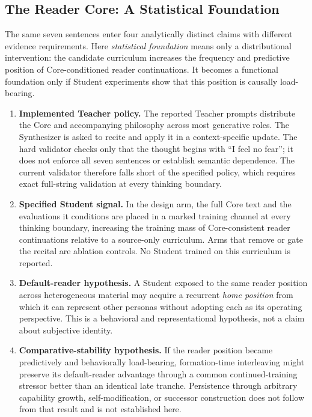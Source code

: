 \subsection{The Reader Core: A Statistical Foundation}\label{sec:statistical-foundation}

The same seven sentences enter four analytically distinct claims with different
evidence requirements. Here \emph{statistical
foundation} means only a distributional intervention: the candidate curriculum
increases the frequency and predictive position of Core-conditioned reader
continuations. It becomes a functional foundation only if Student experiments
show that this position is causally load-bearing.

\begin{enumerate}[leftmargin=*,itemsep=0.45em]
    \item \textbf{Implemented Teacher policy.} The reported Teacher prompts
    distribute the Core and accompanying philosophy across most generative
    roles. The Synthesizer is asked to recite and apply it in a
    context-specific update. The hard validator checks only that the thought
    begins with ``I feel no fear''; it does not enforce all seven sentences or
    establish semantic dependence. The current validator therefore falls short
    of the specified policy, which requires exact full-string validation at
    every thinking boundary.

    \item \textbf{Specified Student signal.} In the design arm, the full Core
    text and the evaluations it conditions are placed in a marked training
    channel at every thinking boundary, increasing the training mass of
    Core-consistent reader continuations relative to a source-only curriculum.
    Arms that remove or gate the recital are ablation controls. No Student
    trained on this curriculum is reported.

    \item \textbf{Default-reader hypothesis.} A Student exposed to the same
    reader position across heterogeneous material may acquire a recurrent
    \emph{home position} from which it can represent other personas without
    adopting each as its operating perspective. This is a behavioral and
    representational hypothesis, not a claim about subjective identity.

    \item \textbf{Comparative-stability hypothesis.} If the reader position
    became predictively and behaviorally load-bearing, formation-time
    interleaving might preserve its default-reader advantage through a common
    continued-training stressor better than an identical late tranche.
    Persistence through arbitrary capability growth, self-modification, or
    successor construction does not follow from that result and is not
    established here.
\end{enumerate}

